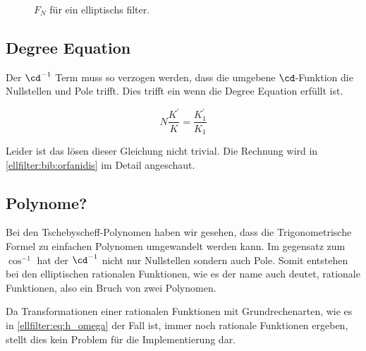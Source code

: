 \begin{refsection}
\begin{figure}
    \centering
    
    \caption{$F_N$ für ein elliptischs filter.}
    \label{ellfilter:fig:elliptic}
\end{figure}

\subsection{Degree Equation}

Der $\cd^{-1}$ Term muss so verzogen werden, dass die umgebene $\cd$-Funktion die Nullstellen und Pole trifft.
Dies trifft ein wenn die Degree Equation erfüllt ist.

\begin{equation}
    N \frac{K^\prime}{K} = \frac{K^\prime_1}{K_1}
\end{equation}


Leider ist das lösen dieser Gleichung nicht trivial.
Die Rechnung wird in \ref{ellfilter:bib:orfanidis} im Detail angeschaut.


\subsection{Polynome?}

Bei den Tschebyscheff-Polynomen haben wir gesehen, dass die Trigonometrische Formel zu einfachen Polynomen umgewandelt werden kann.
Im gegensatz zum $\cos^{-1}$ hat der $\cd^{-1}$ nicht nur Nullstellen sondern auch Pole.
Somit entstehen bei den elliptischen rationalen Funktionen, wie es der name auch deutet, rationale Funktionen, also ein Bruch von zwei Polynomen.

Da Transformationen einer rationalen Funktionen mit Grundrechenarten, wie es in \eqref{ellfilter:eq:h_omega} der Fall ist, immer noch rationale Funktionen ergeben, stellt dies kein Problem für die Implementierung dar.






\end{refsection}
